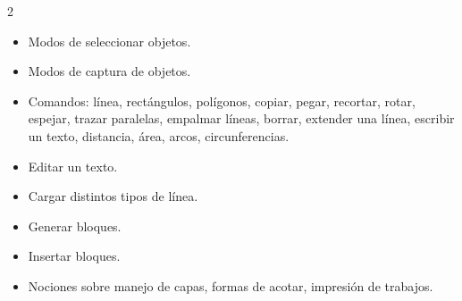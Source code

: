 \documentclass[../main]{subfiles}
\begin{document}
\begin{multicols}{2}
\begin{enumerate}
\begin{itemize}
        \item Modos de seleccionar objetos.
        \item Modos de captura de objetos.
        \item Comandos: línea, rectángulos, polígonos, copiar, pegar,
          recortar, rotar, espejar, trazar paralelas, empalmar líneas,
          borrar, extender una línea, escribir un texto, distancia,
          área, arcos, circunferencias.
        \item Editar un texto.
        \item Cargar distintos tipos de línea.
        \item Generar bloques.
        \item Insertar bloques.
        \item Nociones sobre manejo de capas, formas de acotar,
          impresión de trabajos.
      \end{itemize}
  \end{enumerate}
\end{multicols}
\end{document}
